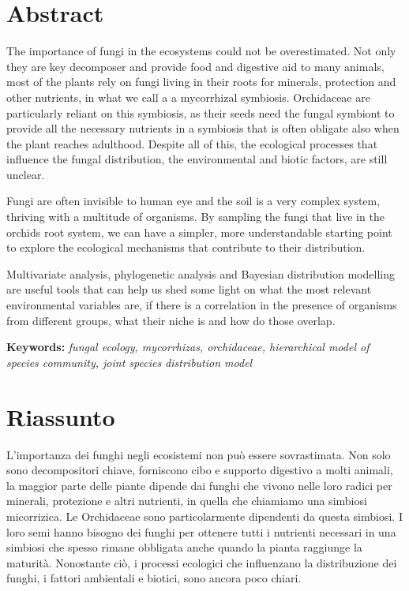 \def\bibliocommand{}


\chapter{Abstract}
\label{abstract}

The importance of fungi in the ecosystems could not be overestimated. Not only they are key decomposer and provide food and digestive aid to many animals, most of the plants rely on fungi living in their roots for minerals, protection and other nutrients, in what we call a a mycorrhizal symbiosis. Orchidaceae are particularly reliant on this symbiosis, as their seeds need the fungal symbiont to provide all the necessary nutrients in a symbiosis that is often obligate also when the plant reaches adulthood. Despite all of this, the ecological processes that influence the fungal distribution, the environmental and biotic factors, are still unclear.

Fungi are often invisible to human eye and the soil is a very complex system, thriving with a multitude of organisms. By sampling the fungi that live in the orchids root system, we can have a simpler, more understandable starting point to explore the ecological mechanisms that contribute to their distribution.

Multivariate analysis, phylogenetic analysis and Bayesian distribution modelling are useful tools that can help us shed some light on what the most relevant environmental variables are, if there is a correlation in the presence of organisms from different groups, what their niche is and how do those overlap.

\textbf{Keywords:} \emph{fungal ecology, mycorrhizas, orchidaceae, hierarchical model of species community, joint species distribution model}

\chapter{Riassunto}
\label{riassunto}

L'importanza dei funghi negli ecosistemi non può essere sovrastimata. Non solo sono decompositori chiave, forniscono cibo e supporto digestivo a molti animali, la maggior parte delle piante dipende dai funghi che vivono nelle loro radici per minerali, protezione e altri nutrienti, in quella che chiamiamo una simbiosi micorrizica. Le Orchidaceae sono particolarmente dipendenti da questa simbiosi. I loro semi hanno bisogno dei funghi per ottenere tutti i nutrienti necessari in una simbiosi che spesso rimane obbligata anche quando la pianta raggiunge la maturità. Nonostante ciò, i processi ecologici che influenzano la distribuzione dei funghi, i fattori ambientali e biotici, sono ancora poco chiari.

